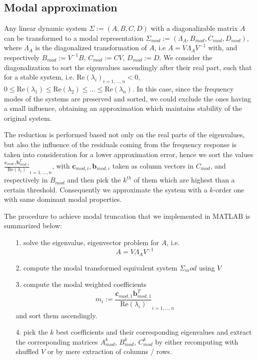 \documentclass[10pt,a4paper]{article}
\begin{document}
\subsection{Modal approximation}
Any linear dynamic system $\Sigma := (A,B,C,D)$ with a diagonalizable matrix $A$ can be transformed to a modal representation $\Sigma_{mod}:=(\Lambda_A,B_{mod},C_{mod},D_{mod})$, where $\Lambda_A$ is the diagonalized transformation of $A$, i.e $A = V\Lambda_AV^{-1}$ with, and respectively $B_{mod} := V^{-1}B$, $C_{mod} := CV$, $D_{mod} := D$. We consider the diagonalization to sort the eigenvalues ascendingly after their real part, such that for a stable system, i.e. $\text{Re}(\lambda_i )_{i=1,...,n}<0$, $0 \leq \text{Re}(\lambda_1)  \leq \text{Re}(\lambda_2) \leq ... \leq \text{Re}(\lambda_n)$. In this case, since the frequency modes of the systems are preserved and sorted, we could exclude the ones having a small influence, obtaining an approximation which maintains stability of the original system.

The reduction is performed based not only on the real parts of the eigenvalues, but also the influence of the residuals coming from the frequency response is taken into consideration for a lower approximation error, hence we sort the values $\frac{\textbf{c}_{mod,i}\textbf{b}_{mod,i}^T}{\text{Re}(\lambda_i)}_{i=1,...,n}$, with $\textbf{c}_{mod,i}, \textbf{b}_{mod,i}$ taken as column vectors in $C_{mod}$,  and respectively in $B_{mod}$ and then pick the $k^{th}$ of them which are highest than a certain threshold. Consequently we approximate the system with a $k$-order one with same dominant modal properties.

The procedure to achieve modal truncation that we implemented in MATLAB is summarized below:
\begin{itemize}
\item [1.] solve the eigenvalue, eigenvector problem for $A$, i.e. $$ A = V\Lambda_AV^{-1}$$
\item [2.] compute the modal transformed equivalent system $\Sigma_mod$ using $V$
\item [3.] compute the modal weighted coefficients $$m_i := \frac{\textbf{c}_{mod,1}\textbf{b}_{mod,1}^T}{\text{Re}(\lambda_i)}_{i=1,...,n}$$ and sort them ascendingly.
\item [4.] pick the $k$ best coefficients and their corresponding eigenvalues and extract the corresponding matrices $A_{mod}^k$, $B_{mod}^k$, $C_{mod}^k$ by either recomputing with shuffled $V$ or by mere extraction of columns / rows.
\end{itemize}
\end{document}
